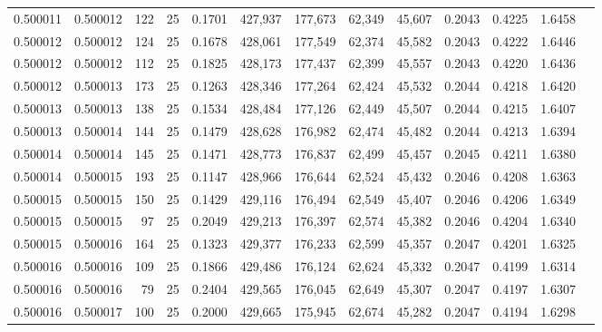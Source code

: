 \begin{tabular}{rrrrrrrrrrrrr}
0.500011 & 0.500012 & 122 &  25 &                                     0.1701 & 427,937 & 177,673 &  62,349 &  45,607 & 0.2043 & 0.4225 & 1.6458 \\
0.500012 & 0.500012 & 124 &  25 &                                     0.1678 & 428,061 & 177,549 &  62,374 &  45,582 & 0.2043 & 0.4222 & 1.6446 \\
0.500012 & 0.500012 & 112 &  25 &                                     0.1825 & 428,173 & 177,437 &  62,399 &  45,557 & 0.2043 & 0.4220 & 1.6436 \\
0.500012 & 0.500013 & 173 &  25 &                                     0.1263 & 428,346 & 177,264 &  62,424 &  45,532 & 0.2044 & 0.4218 & 1.6420 \\
0.500013 & 0.500013 & 138 &  25 &                                     0.1534 & 428,484 & 177,126 &  62,449 &  45,507 & 0.2044 & 0.4215 & 1.6407 \\
0.500013 & 0.500014 & 144 &  25 &                                     0.1479 & 428,628 & 176,982 &  62,474 &  45,482 & 0.2044 & 0.4213 & 1.6394 \\
0.500014 & 0.500014 & 145 &  25 &                                     0.1471 & 428,773 & 176,837 &  62,499 &  45,457 & 0.2045 & 0.4211 & 1.6380 \\
0.500014 & 0.500015 & 193 &  25 &                                     0.1147 & 428,966 & 176,644 &  62,524 &  45,432 & 0.2046 & 0.4208 & 1.6363 \\
0.500015 & 0.500015 & 150 &  25 &                                     0.1429 & 429,116 & 176,494 &  62,549 &  45,407 & 0.2046 & 0.4206 & 1.6349 \\
0.500015 & 0.500015 &  97 &  25 &                                     0.2049 & 429,213 & 176,397 &  62,574 &  45,382 & 0.2046 & 0.4204 & 1.6340 \\
0.500015 & 0.500016 & 164 &  25 &                                     0.1323 & 429,377 & 176,233 &  62,599 &  45,357 & 0.2047 & 0.4201 & 1.6325 \\
0.500016 & 0.500016 & 109 &  25 &                                     0.1866 & 429,486 & 176,124 &  62,624 &  45,332 & 0.2047 & 0.4199 & 1.6314 \\
0.500016 & 0.500016 &  79 &  25 &                                     0.2404 & 429,565 & 176,045 &  62,649 &  45,307 & 0.2047 & 0.4197 & 1.6307 \\
0.500016 & 0.500017 & 100 &  25 &                                     0.2000 & 429,665 & 175,945 &  62,674 &  45,282 & 0.2047 & 0.4194 & 1.6298 \\

\end{tabular}
